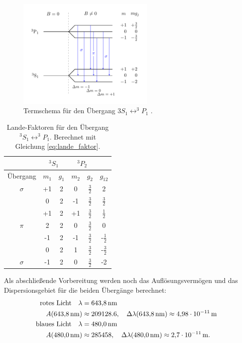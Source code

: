 \FloatBarrier
\begin{figure}[h]
  \centering
  \includegraphics[width=0.6\textwidth]{pics/termschema_blau.pdf}
  \caption{Termschema für den Übergang $3S_1\leftrightarrow ^3\!\!P_1$ \cite{luckyjosh}.}
  \label{fig: termschema_blau}
\end{figure}
\FloatBarrier

\FloatBarrier
\begin{table}

  \caption{Lande-Faktoren für den Übergang $^3S_1\leftrightarrow ^3\!\!P_1$. Berechnet mit Gleichung \eqref{eq:lande_faktor}.}
	\label{tab:Lande_blau}
	\centering
  \renewcommand{\arraystretch}{1.2}
  \begin{tabular}{cccccc}
		\toprule
    & \multicolumn{2}{c}{${}^3S_1$}  & \multicolumn{2}{c}{${}^3P_2$} \\
		\midrule
    Übergang & $m_1$  & $g_{1}$ & $m_2$ & $ g_2$ & $g_{12}$\\
		\midrule
		$\sigma$ & +1 & 2 & 0 & $\frac{3}{2}$& 2\\
		& 0 & 2 & -1 & $\frac{3}{2}$ & $\frac{3}{2}$\\
		\midrule
		& +1 & 2 & +1 & $\frac{3}{2}$ & $\frac{1}{2}$\\
		$\pi$ & 2 & 2 & 0 & $\frac{3}{2}$ & 0 \\
		& -1 & 2 & -1 & $\frac{3}{2}$ & -$\frac{1}{2}$\\
		\midrule
		& 0 & 2 & 1 & $\frac{3}{2}$ & -$\frac{3}{2}$\\
		$\sigma$ & -1 & 2 & 0 & $\frac{3}{2}$& -2\\
		\bottomrule
	\end{tabular}
\end{table}
\FloatBarrier

Als abschließende Vorbereitung werden noch das Auflösungsvermögen und das Dispersionsgebiet
für die beiden Übergänge berechnet:
\begin{align}
\text{rotes Licht}\quad  \lambda&=\SI{643.8}{\nano\meter} \notag\\
   A(\SI{643.8}{\nano\meter})&\approx 209128.6, \quad \Delta \lambda(\SI{643.8}{\nano\meter})\approx\SI{4.98e-11}{\meter} \label{eq: auf_dis_rot} \\
\text{blaues Licht}  \quad \lambda&=\SI{480.0}{\nano\meter}\notag \\
 A(\SI{480.0}{\nano\meter})&\approx 285458, \quad \Delta \lambda(\SI{480.0}{\nano\meter})\approx \SI{2.7e-11}{\meter} \label{eq: auf_dis_blau}.
\end{align}


